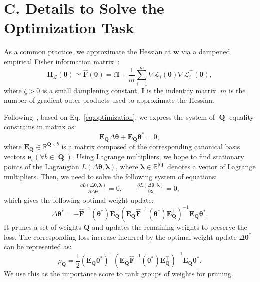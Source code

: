 \documentclass[letterpaper]{article} %
\begin{document}
\section{C. Details to Solve the Optimization Task}\label{app: optim}
As a common practice, we approximate the Hessian at $\bm{w}$ via a dampened empirical Fisher information matrix~\citep{hassibi1992second}:
\begin{equation}
    \bm{H}_\mathcal{L}(\bm\theta) \simeq \hat{\bm{F}}(\bm\theta) = \zeta\bm{I} + \frac{1}{m}\sum_{i = 1}^{m} \nabla \mathcal{L}_i (\bm\theta) \nabla \mathcal{L}_i^{\top}(\bm{\theta}),
\end{equation}
where $\zeta > 0$ is a small damplening constant, $\bm{I}$ is the indentity matrix. $m$ is the number of gradient outer products used to approximate the Hessian. 

Following~\citet{kurtic2022optimal}, based on Eq.~\eqref{eq:optimization}, we express the system of $|\bm{Q}|$ equality constrains in matrix as:
\begin{equation}
    \bm{E}_{\bm{Q}} \Delta \bm{\theta} + \bm{E}_{\bm{Q}} \bm{\theta}^\ast = 0,
\end{equation}
where $\bm{E}_{\bm{Q}} \in \mathbb{R}^{\bm{Q}\times b}$ is a matrix composed of the corresponding canonical basis vectors $\bm{e}_b (\forall b \in |\bm{Q}|)$. Using Lagrange multipliers, we hope to find stationary points of the Lagrangian $L(\Delta \bm{\theta}, \bm\lambda)$, where $\bm{\lambda} \in \mathbb{R}^{|\bm{Q}|}$ denotes a vector of Lagrange multipliers. Then, we need to solve the following system of equations:
\begin{equation}\label{eq:lagrange}
\begin{aligned}
    \frac{\partial L (\Delta \bm{\theta}, \bm{\lambda})}{\partial \Delta \bm{\theta}} = 0, \quad\quad
    \frac{\partial L (\Delta \bm{\theta}, \bm{\lambda})}{\partial \bm{\lambda}} = 0,
\end{aligned}
\end{equation}
which gives the following optimal weight update:
\begin{equation}
    \Delta \bm{\theta}^\ast = -\hat{\bm{F}}^{-1}(\bm{\theta}^\ast)\bm{E}_{\bm{Q}}^{\top}(\bm{E}_{\bm{Q}}\hat{\bm{F}}^{-1}(\bm{\theta}^\ast)\bm{E}_{\bm{Q}}^{\top})^{-1}\bm{E}_{\bm{Q}}\bm\theta^{\ast}.
\end{equation}
It prunes a set of weights $\bm{Q}$ and updates the remaining weights to preserve the loss. The corresponding loss increase incurred by the optimal weight update $\Delta\bm{\theta}^{\ast}$ can be represented as:
\begin{equation}
    \rho_{\bm{Q}} = \frac{1}{2}(\bm{E}_{\bm{Q}}\bm{\theta}^\ast)^\top (\bm{E}_{\bm{Q}}\hat{\bm{F}}^{-1}(\bm{\theta}^{\ast})\bm{E}_{\bm{Q}}^{\top})^{-1} \bm{E}_{\bm{Q}} \bm{\theta}^{\ast}.
\end{equation}
We use this as the importance score to rank groups of weights for pruning.
\end{document}
